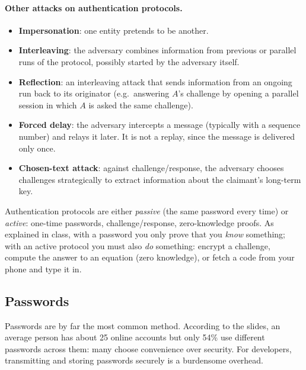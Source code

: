 \paragraph{Other attacks on authentication protocols.}
\begin{itemize}
    \item \textbf{Impersonation}: one entity pretends to be another.
    \item \textbf{Interleaving}: the adversary combines information from previous or parallel runs of the protocol, possibly started by the adversary itself.
    \item \textbf{Reflection}: an interleaving attack that sends information from an ongoing run back to its originator (e.g.\ answering $A$'s challenge by opening a parallel session in which $A$ is asked the same challenge).
    \item \textbf{Forced delay}: the adversary intercepts a message (typically with a sequence number) and relays it later. It is not a replay, since the message is delivered only once.
    \item \textbf{Chosen-text attack}: against challenge/response, the adversary chooses challenges strategically to extract information about the claimant's long-term key.
\end{itemize}
Authentication protocols are either \emph{passive} (the same password every time) or \emph{active}: one-time passwords, challenge/response, zero-knowledge proofs. As explained in class, with a password you only prove that you \emph{know} something; with an active protocol you must also \emph{do} something: encrypt a challenge, compute the answer to an equation (zero knowledge), or fetch a code from your phone and type it in.

\subsection{Passwords}

Passwords are by far the most common method. According to the slides, an average person has about 25 online accounts but only 54\% use different passwords across them: many choose convenience over security. For developers, transmitting and storing passwords securely is a burdensome overhead.

